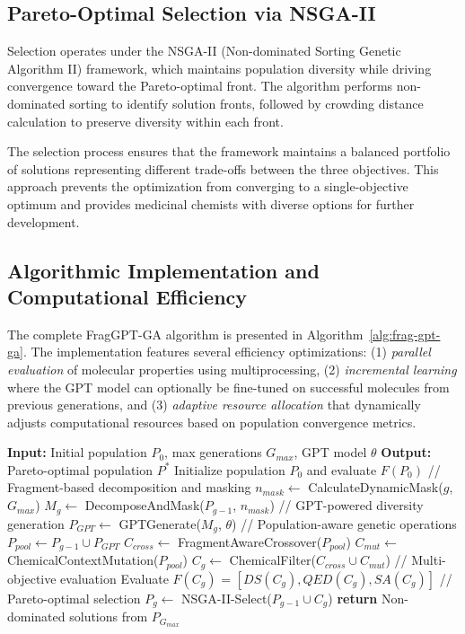 \documentclass[lettersize,journal]{IEEEtran}
\begin{document}
\subsection{Pareto-Optimal Selection via NSGA-II\cite{deb2002fast}}

Selection operates under the NSGA-II\cite{deb2002fast} (Non-dominated Sorting Genetic Algorithm II) framework, which maintains population diversity while driving convergence toward the Pareto-optimal front. The algorithm performs non-dominated sorting to identify solution fronts, followed by crowding distance calculation to preserve diversity within each front.

The selection process ensures that the framework maintains a balanced portfolio of solutions representing different trade-offs between the three objectives. This approach prevents the optimization from converging to a single-objective optimum and provides medicinal chemists with diverse options for further development.
\subsection{Algorithmic Implementation and Computational Efficiency}

The complete FragGPT-GA algorithm is presented in Algorithm~\ref{alg:frag-gpt-ga}. The implementation features several efficiency optimizations: (1) \textit{parallel evaluation} of molecular properties using multiprocessing, (2) \textit{incremental learning} where the GPT model can optionally be fine-tuned on successful molecules from previous generations, and (3) \textit{adaptive resource allocation} that dynamically adjusts computational resources based on population convergence metrics.

\begin{algorithm}[!t]
\caption{FragGPT-GA Complete Framework}
\label{alg:frag-gpt-ga}
\begin{algorithmic}
\STATE \textbf{Input:} Initial population $P_0$, max generations $G_{max}$, GPT model $\theta$
\STATE \textbf{Output:} Pareto-optimal population $P^*$
\STATE Initialize population $P_0$ and evaluate $F(P_0)$
    \STATE // Fragment-based decomposition and masking
    \STATE $n_{mask} \leftarrow$ CalculateDynamicMask($g$, $G_{max}$)
    \STATE $M_g \leftarrow$ DecomposeAndMask($P_{g-1}$, $n_{mask}$)
    \STATE // GPT-powered diversity generation
    \STATE $P_{GPT} \leftarrow$ GPTGenerate($M_g$, $\theta$)
    \STATE // Population-aware genetic operations
    \STATE $P_{pool} \leftarrow P_{g-1} \cup P_{GPT}$
    \STATE $C_{cross} \leftarrow$ FragmentAwareCrossover($P_{pool}$)
    \STATE $C_{mut} \leftarrow$ ChemicalContextMutation($P_{pool}$)
    \STATE $C_g \leftarrow$ ChemicalFilter($C_{cross} \cup C_{mut}$)
    \STATE // Multi-objective evaluation
    \STATE Evaluate $F(C_g)$ = $[DS(C_g), QED(C_g), SA(C_g)]$
    \STATE // Pareto-optimal selection
    \STATE $P_g \leftarrow$ NSGA-II-Select($P_{g-1} \cup C_g$)
\ENDFOR
\STATE \textbf{return} Non-dominated solutions from $P_{G_{max}}$
\end{algorithmic}
\end{algorithm}
\end{document}
